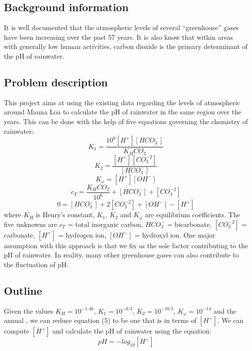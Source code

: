 \documentclass{book}
\begin{document}
	\subsection{Background information}
	It is well documented that the atmospheric levels of several “greenhouse” gases have been increasing over the past 57 years. It is also know that within areas with generally low human activities, carbon dioxide is the primary determinant of the pH of rainwater.
	
	\subsection{Problem description}
	This project aims at using the existing data regarding the levels of atmospheric  around Mauna Loa to calculate the pH of rainwater in the same region over the years. This can be done with the help of five equations governing the chemistry of rainwater:
	\[ K_1 = \frac{10^6[H^+][HCO_3^-]}{K_HCO_2} \tag{1} \]
	\[ K_2 = \frac{[H^+][CO_3^{-2}]}{[HCO_3^-]} \tag{2} \]
	\[ K_\omega = [H^+][OH^-] \tag{3} \]
	\[ c_T = \frac{K_HCO_2}{10^6} + [HCO_3^-] + [CO_3^{-2}] \tag{4} \]
	\[ 0 = [HCO_3^-] + 2[CO_3^{-2}] + [OH^-] - [H^+] \tag{5} \]
	where ${K_H}$ is Henry's constant, ${K_1}$, ${K_2}$ and ${K_\omega}$ are equilibrium coefficients. The five unknowns are ${c_T}$ = total inorganic carbon, ${HCO_3^-}$ = bicarbonate, ${[CO_3^{-2}]}$ = carbonate, ${[H^+]}$ = hydrogen ion, ${[OH^-]}$ = hydroxyl ion.
	One major assumption with this approach is that we fix  as the sole factor contributing to the pH of rainwater. In reality, many other greenhouse gases can also contribute to the fluctuation of pH.

	\subsection{Outline}
	Given the values ${K_H  = 10^{-1.46}}$, ${ K_1 =  10^{-6.3}}$, ${ K_2 = 10^{-10.3}}$, ${ K_\omega = 10^{-14}}$ and the annual , we can reduce equation (5) to be one that is in terms of ${[H^+]}$. We can compute ${[H^+]}$ and calculate the pH of rainwater using the equation:
	\[ pH = -log_{10}[H^+] \tag{6} \]
	
\end{document}
